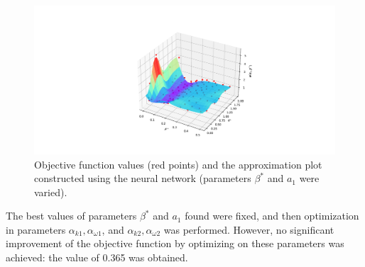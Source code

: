 \documentclass[mathematics,article,submit,pdftex,moreauthors]{Definitions/mdpi}
\begin{document}
\begin{figure}[H]
\begin{center}
\includegraphics[width=10.5 cm]{NN_100_point_.pdf}
\caption{Objective function values (red points) and the approximation plot constructed using the neural network (parameters $\beta^*$ and $a_1$ were varied).\label{NN_100_point}}
\end{center}
\end{figure}   
\unskip

The best values of parameters $\beta^*$ and $a_1$ found were fixed, and then optimization in parameters $\alpha_{k1}, \alpha_{\omega1}$, and $\alpha_{k2}, \alpha_{\omega2}$ was performed. 
However, no significant improvement of the objective function by optimizing on these parameters was achieved: the value of 0.365 was obtained.


%
%
\end{document}
